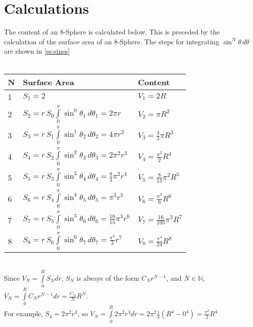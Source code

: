 \documentclass [letterpaper]{article}
\begin{document}
\section{Calculations}
The content of an 8-Sphere is calculated below. This is preceded by the calculation of the surface area of an 8-Sphere. The steps for integrating $\sin^N\theta\,d\theta$ are shown in \ref{ss:sines}\\\\
\begin{tabular}{|l|l|l|}
\hline
N & Surface Area & Content \\\hline
1 & $S_1=2$ & $V_1=2R$\\\hline
2 & $S_2=r\,S_0\int\limits_0^\pi \sin^0 \theta_1\,d\theta_1 = 2\pi r$ & $V_2=\pi R^2$ \\\hline
3 & $S_3=r\,S_1\int\limits_0^\pi \sin^1\theta_2\,d\theta_2=4\pi r^2$ & $V_3=\frac{4}{3}\pi R^3$\\\hline
4 & $S_4=r\,S_2\int\limits_0^\pi \sin^2\theta_3\,d\theta_3=2\pi^2 r^3$ & $V_4=\frac{\pi^2}{2}R^4$\\\hline
5 & $S_5=r\,S_3\int\limits_0^\pi \sin^3\theta_4\,d\theta_4=\frac{8}{3}\pi^2 r^4$ & $V_5=\frac{8}{15}\pi^2R^5$ \\\hline
6 & $S_6=r\,S_4\int\limits_0^\pi \sin^4\theta_5\,d\theta_5=\pi^3 r^5$ & $V_6=\frac{\pi^3}{6}R^6$ \\\hline
7 & $S_7=r\,S_5\int\limits_0^\pi \sin^5\theta_6\,d\theta_6=\frac{16}{15}\pi^3 r^6$ & $V_7=\frac{16}{105}\pi^3R^7$\\\hline
8 & $S_8=r\,S_6\int\limits_0^\pi \sin^6\theta_7\,d\theta_7=\frac{\pi^4}{3}r^7$ & $V_8=\frac{\pi^4}{24}R^8$\\\hline
\end{tabular}\\
Since $V_N=\int\limits_0^RS_Ndr$, $S_N$ is always of the form $C_Nr^{N-1}$, and $N\in\mathbb{N}$, $V_N=\int\limits_0^RC_Nr^{N-1}dr=\frac{C_N}{N}R^N$.\\
For example, $S_4=2\pi^2 r^3$, so $V_N=\int\limits_0^R2\pi^2 r^3dr=2\pi^2\frac{1}{4}(R^4-0^4)=\frac{\pi^2}{2}R^4$
\end{document}

